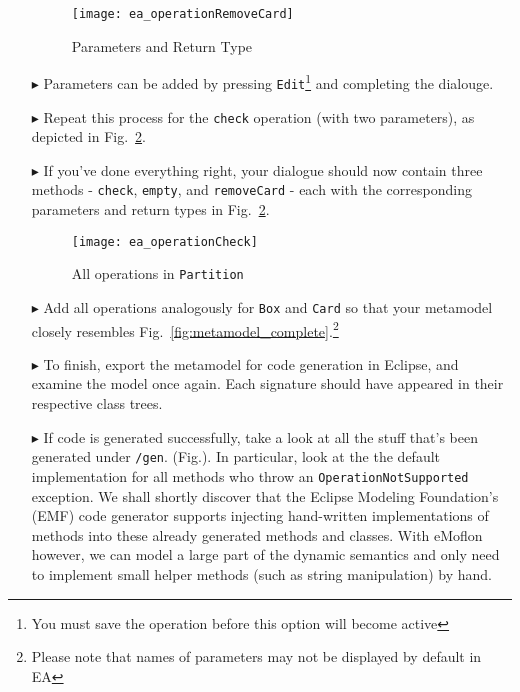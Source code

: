 \begin{enumerate}
\begin{figure}[htbp]
	\centering
  \texttt{[image: ea\_operationRemoveCard]}
	\caption{Parameters and Return Type}
	\label{fig:operation_parameters}
\end{figure}

\item[$\blacktriangleright$] Parameters can be added by pressing \texttt{Edit}\footnote{You must save the operation before this option will become active} and
completing the dialouge.

\item[$\blacktriangleright$] Repeat this process for the \texttt{check} operation (with two parameters), as depicted in Fig.~\ref{fig:operation_partition}. 

\item[$\blacktriangleright$] If you've done everything right, your dialogue should now contain three methods - \texttt{check}, \texttt{empty}, and
\texttt{removeCard} - each with the corresponding parameters and return types in Fig.~\ref{fig:operation_partition}.

\begin{figure}[htbp]
	\centering
  \texttt{[image: ea\_operationCheck]}
	\caption{All operations in \texttt{Partition}}
	\label{fig:operation_partition}
\end{figure}

\item[$\blacktriangleright$] Add all operations analogously for \texttt{Box} and \texttt{Card} so that your metamodel closely resembles
Fig.~\ref{fig:metamodel_complete}.\footnote{Please note that names of parameters may not be displayed by default in EA}

\item[$\blacktriangleright$] To finish, export the metamodel for code generation in Eclipse, and examine the model once again. Each signature should have
appeared in their respective class trees.

\item[$\blacktriangleright$]  If code is generated successfully, take a look at all the stuff that's been generated under \texttt{/gen}. (Fig.). In particular,
look at the the default implementation for all methods who throw an \texttt{OperationNotSupported} exception. We shall shortly discover that the Eclipse
Modeling Foundation's (EMF) code generator supports injecting hand-written implementations of methods into these already generated methods and classes.
With eMoflon however, we can model a large part of the dynamic semantics and only need to implement small helper methods (such as string manipulation) by
hand.


\end{enumerate}
